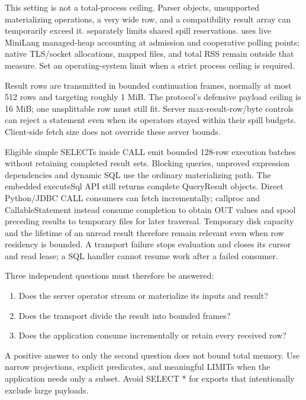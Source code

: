 This setting is not a total-process ceiling. Parser objects, unsupported materializing operations, a very wide row, and a compatibility result array can temporarily exceed it.  separately limits shared spill reservations.  uses live MiniLang managed-heap accounting at admission and cooperative polling points; native TLS/socket allocations, mapped files, and total RSS remain outside that measure. Set an operating-system limit when a strict process ceiling is required.

Result rows are transmitted in bounded continuation frames, normally at most 512 rows and targeting roughly 1 MiB. The protocol's defensive payload ceiling is 16 MiB; one unsplittable row must still fit. Server max-result-row/byte controls can reject a statement even when its operators stayed within their spill budgets. Client-side fetch size does not override these server bounds.

Eligible simple SELECTs inside CALL emit bounded 128-row execution batches
without retaining completed result sets. Blocking queries, unproved expression
dependencies and dynamic SQL use the ordinary materializing path. The embedded
executeSql API still returns complete QueryResult objects. Direct Python/JDBC
CALL consumers can fetch incrementally; callproc and CallableStatement instead
consume completion to obtain OUT values and spool preceding results to
temporary files for later traversal. Temporary disk capacity and the lifetime
of an unread result therefore remain relevant even when row residency is
bounded. A transport failure stops evaluation and closes its cursor and read
lease; a SQL handler cannot resume work after a failed consumer.

Three independent questions must therefore be answered:

\begin{enumerate}
\item Does the server operator stream or materialize its inputs and result?
\item Does the transport divide the result into bounded frames?
\item Does the application consume incrementally or retain every received row?
\end{enumerate}

A positive answer to only the second question does not bound total memory. Use narrow projections, explicit predicates, and meaningful LIMITs when the application needs only a subset. Avoid SELECT * for exports that intentionally exclude large payloads.

